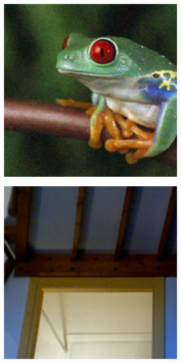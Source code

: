 \begin{figure}
\begin{subfigure}[t]{0.19\textwidth}
    \end{subfigure}
    \hfill
    \begin{subfigure}[t]{0.19\textwidth}
        \centering
        \includegraphics[width=1\textwidth]{images/guided/resize_frog.png}
    \end{subfigure}
    \hfill
    \begin{subfigure}[t]{0.19\textwidth}
        \centering
        \includegraphics[width=1\textwidth]{images/guided/resize_room.png}

\end{subfigure}
\end{figure}
